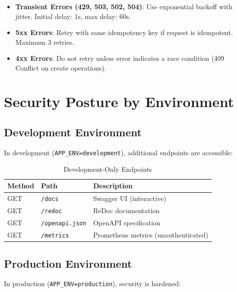 \begin{itemize}
    \item \textbf{Transient Errors (429, 503, 502, 504)}: Use exponential backoff with jitter. Initial delay: 1s, max delay: 60s.
    \item \textbf{5xx Errors}: Retry with same idempotency key if request is idempotent. Maximum 3 retries.
    \item \textbf{4xx Errors}: Do not retry unless error indicates a race condition (409 Conflict on create operations).
\end{itemize}

\section{Security Posture by Environment}
\label{app:api:security-posture}

\subsection{Development Environment}

In development (\texttt{APP\_ENV=development}), additional endpoints are accessible:

\begin{table}[ht]
\centering
\caption{Development-Only Endpoints}
\label{tab:dev-endpoints}
\small
\begin{tabularx}{\textwidth}{llX}
    \hline
    \textbf{Method} & \textbf{Path} & \textbf{Description} \\
    \hline
    GET & \texttt{/docs} & Swagger UI (interactive) \\
    GET & \texttt{/redoc} & ReDoc documentation \\
    GET & \texttt{/openapi.json} & OpenAPI specification \\
    GET & \texttt{/metrics} & Prometheus metrics (unauthenticated) \\
    \hline
\end{tabularx}
\end{table}

\subsection{Production Environment}

In production (\texttt{APP\_ENV=production}), security is hardened:

